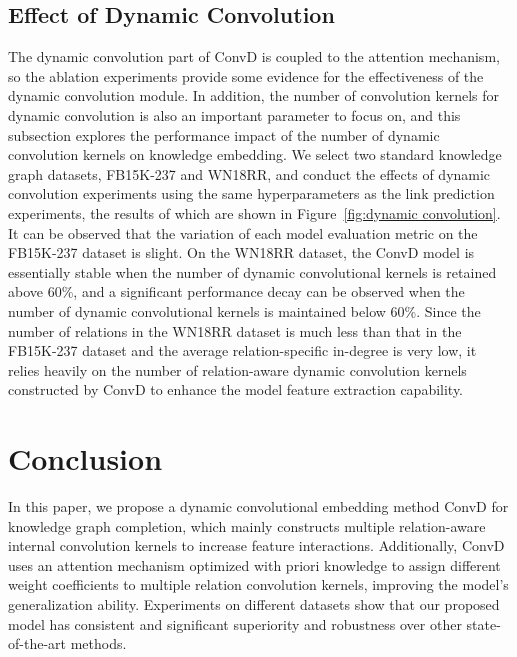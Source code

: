 \documentclass[letterpaper]{article} %
\begin{document}
\subsection{Effect of Dynamic Convolution}
The dynamic convolution part of ConvD is coupled to the attention mechanism, so the ablation experiments provide some evidence for the effectiveness of the dynamic convolution module. In addition, the number of convolution kernels for dynamic convolution is also an important parameter to focus on, and this subsection explores the performance impact of the number of dynamic convolution kernels on knowledge embedding. We select two standard knowledge graph datasets, FB15K-237 and WN18RR, and conduct the effects of dynamic convolution experiments using the same hyperparameters as the link prediction experiments, the results of which are shown in Figure~\ref{fig:dynamic convolution}. It can be observed that the variation of each model evaluation metric on the FB15K-237 dataset is slight. On the WN18RR dataset, the ConvD model is essentially stable when the number of dynamic convolutional kernels is retained above 60\%, and a significant performance decay can be observed when the number of dynamic convolutional kernels is maintained below 60\%. Since the number of relations in the WN18RR dataset is much less than that in the FB15K-237 dataset and the average relation-specific in-degree is very low, it relies heavily on the number of relation-aware dynamic convolution kernels constructed by ConvD to enhance the model feature extraction capability. 



\section{Conclusion}
In this paper, we propose a dynamic convolutional embedding method ConvD for knowledge graph completion, which mainly constructs multiple relation-aware internal convolution kernels to increase feature interactions. Additionally, ConvD uses an attention mechanism optimized with priori knowledge to assign different weight coefficients to multiple relation convolution kernels, improving the model's generalization ability. Experiments on different datasets show that our proposed model has consistent and significant superiority and robustness over other state-of-the-art methods.





\end{document}
